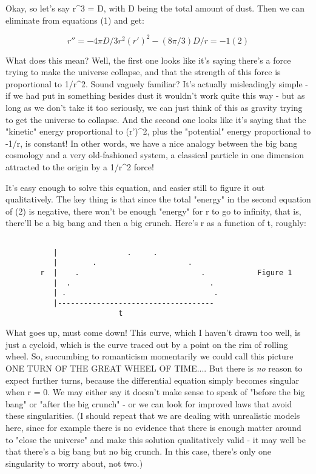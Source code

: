 Okay, so let's say \rho  r^{3} = D, with D being the total amount of dust.  
Then we can eliminate \rho  from equations (1) and get:


$$

r'' = -4\pi D/3r^{2}          (r')^{2} - (8\pi /3) D/r = - 1                (2)
$$
    

What does this mean?   Well, the first one looks like it's saying
there's a force trying to make the universe collapse, and that the
strength of this force is proportional to 1/r^{2}.  Sound vaguely
familiar?  It's actually misleadingly simple - if we had put in
something besides dust it wouldn't work quite this way - but as long as we
don't take it too seriously, we can just think of this as gravity trying
to get the universe to collapse.  And the second one looks like it's
saying that the "kinetic" energy proportional to (r')^{2}, plus the
"potential" energy proportional to -1/r, is constant!  In other words,
we have a nice analogy between the big bang cosmology and a very
old-fashioned system, a classical particle in one dimension attracted to
the origin by a 1/r^{2} force!   

It's easy enough to solve this equation, and easier still to figure it out
qualitatively.  The key thing is that since the total "energy" in
the second equation of (2) is negative, there won't be enough "energy"
for r to go to infinity, that is, there'll be a big bang and then a big
crunch.  Here's r as a function of t, roughly:



\begin{verbatim}

           |                .     .
           |        .                     .
        r  |    .                            .            Figure 1
           |  .                                .
           | .                                  .
           |------------------------------------
                          t
\end{verbatim}
    

What goes up, must come down!  This curve, which I haven't drawn too
well, is just a cycloid, which is the curve traced out by a point on the
rim of rolling wheel.  So, succumbing to romanticism momentarily we
could call this picture ONE TURN OF THE GREAT WHEEL OF TIME....  But
there is \emph{no} reason to expect further turns, because the
differential equation simply becomes singular when r = 0.  We may either
say it doesn't make sense to speak of "before the big bang" or "after
the big crunch" - or we can look for improved laws that avoid these
singularities.  (I should repeat that we are dealing with unrealistic models
here, since for example there is no evidence that there is enough matter
around to "close the universe" and make this solution qualitatively
valid - it may well be that there's a big bang but no big crunch.  In
this case, there's only one singularity to worry about, not two.)  


